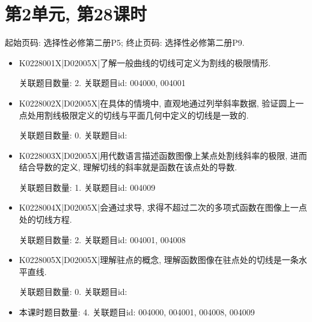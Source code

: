 \section*{第2单元, 第28课时}
起始页码: 选择性必修第二册P5; 终止页码: 选择性必修第二册P9.
\begin{itemize}
\item K0228001X|D02005X|了解一般曲线的切线可定义为割线的极限情形.

关联题目数量: 2. 关联题目id: 004000, 004001

\item K0228002X|D02005X|在具体的情境中, 直观地通过列举斜率数据, 验证圆上一点处用割线极限定义的切线与平面几何中定义的切线是一致的.

关联题目数量: 0. 关联题目id: 

\item K0228003X|D02005X|用代数语言描述函数图像上某点处割线斜率的极限, 进而结合导数的定义, 理解切线的斜率就是函数在该点处的导数.

关联题目数量: 1. 关联题目id: 004009

\item K0228004X|D02005X|会通过求导, 求得不超过二次的多项式函数在图像上一点处的切线方程.

关联题目数量: 2. 关联题目id: 004001, 004008

\item K0228005X|D02005X|理解驻点的概念, 理解函数图像在驻点处的切线是一条水平直线.

关联题目数量: 0. 关联题目id: 

\item 本课时题目数量: 4. 关联题目id: 004000, 004001, 004008, 004009

\end{itemize}


